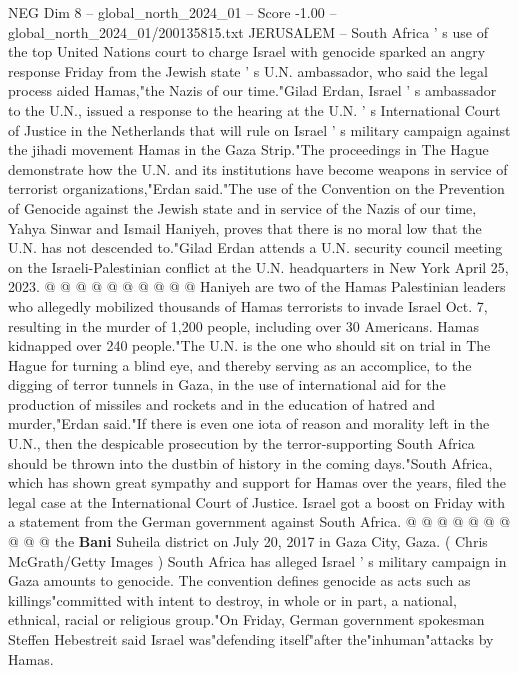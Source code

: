 \begin{textsample}{NEG Dim 8 – global\_north\_2024\_01 – Score -1.00 – global\_north\_2024\_01/200135815.txt}  \label{ex:f8_neg_279}
JERUSALEM -- South Africa ' s use of the top United Nations court to charge Israel with genocide sparked an angry response Friday from the Jewish state ' s U.N. ambassador, who said the legal process aided Hamas,"the Nazis of our time."Gilad Erdan, Israel ' s ambassador to the U.N., issued a response to the hearing at the U.N. ' s International Court of Justice in the Netherlands that will rule on Israel ' s military campaign against the jihadi movement Hamas in the Gaza Strip."The proceedings in The Hague demonstrate how the U.N. and its institutions have become weapons in service of terrorist organizations,"Erdan said."The use of the Convention on the Prevention of Genocide against the Jewish state and in service of the Nazis of our time, Yahya Sinwar and Ismail Haniyeh, proves that there is no moral low that the U.N. has not descended to."Gilad Erdan attends a U.N. security council meeting on the Israeli-Palestinian conflict at the U.N. headquarters in New York April 25, 2023. @ @ @ @ @ @ @ @ @ @ Haniyeh are two of the Hamas Palestinian leaders who allegedly mobilized thousands of Hamas terrorists to invade Israel Oct. 7, resulting in the murder of 1,200 people, including over 30 Americans.
Hamas kidnapped over 240 people."The U.N. is the one who should sit on trial in The Hague for turning a blind eye, and thereby serving as an accomplice, to the digging of terror tunnels in Gaza, in the use of international aid for the production of missiles and rockets and in the education of hatred and murder,"Erdan said."If there is even one iota of reason and morality left in the U.N., then the despicable prosecution by the terror-supporting South Africa should be thrown into the dustbin of history in the coming days."South Africa, which has shown great sympathy and support for Hamas over the years, filed the legal case at the International Court of Justice.
Israel got a boost on Friday with a statement from the German government against South Africa. @ @ @ @ @ @ @ @ @ @ the \textbf{Bani} Suheila district on July 20, 2017 in Gaza City, Gaza. ( Chris McGrath/Getty Images ) South Africa has alleged Israel ' s military campaign in Gaza amounts to genocide.
The convention defines genocide as acts such as killings"committed with intent to destroy, in whole or in part, a national, ethnical, racial or religious group."On Friday, German government spokesman Steffen Hebestreit said Israel was"defending itself"after the"inhuman"attacks by Hamas.

\end{textsample}
